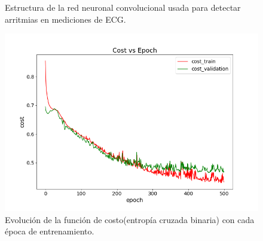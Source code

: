 \documentclass[11pt,letterpaper]{article}
\begin{document}
\begin{justify}
\begin{figure}[H]
\begin{minipage}{.48\linewidth}
\caption{\footnotesize{Estructura de la red neuronal convolucional usada para detectar arritmias en mediciones de ECG.}}
\label{arq}
\end{minipage}
\hfill
\begin{minipage}{.48\linewidth}
\includegraphics[width=\linewidth]{Build.png} 
\vspace{-0,8cm}
\caption{\footnotesize{Evolución de la función de costo(entropía cruzada binaria) con cada época de entrenamiento.}}
\label{build}
\end{minipage}
\end{figure}


\end{justify}
\end{document}
